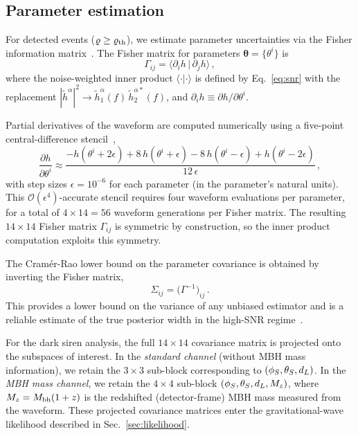 \subsection{Parameter estimation}
\label{sec:fisher}

For detected events ($\varrho \geq \varrho_\mathrm{th}$), we estimate parameter
uncertainties via the Fisher information matrix~\cite{Vallisneri:2007ev}.
The Fisher matrix for parameters $\boldsymbol{\theta} = \{\theta^i\}$ is
\begin{equation}
  \Gamma_{ij} = \bigl\langle \partial_i h \,\big|\, \partial_j h \bigr\rangle \,,
  \label{eq:fisher}
\end{equation}
where the noise-weighted inner product $\langle \cdot | \cdot \rangle$
is defined by Eq.~\eqref{eq:snr} with the replacement
$|\tilde{h}^\alpha|^2 \to
\tilde{h}_1^{\alpha}(f)\,\tilde{h}_2^{\alpha *}(f)$,
and $\partial_i h \equiv \partial h / \partial \theta^i$.

Partial derivatives of the waveform are computed numerically using a
five-point central-difference stencil~\cite{Vallisneri:2007ev},
\begin{equation}
  \frac{\partial h}{\partial \theta^i} \approx
  \frac{-h(\theta^i + 2\epsilon) + 8\,h(\theta^i + \epsilon)
    - 8\,h(\theta^i - \epsilon) + h(\theta^i - 2\epsilon)}
  {12\,\epsilon} \,,
  \label{eq:five_point}
\end{equation}
with step sizes $\epsilon = 10^{-6}$ for each parameter (in the
parameter's natural units).
This $\mathcal{O}(\epsilon^4)$-accurate stencil requires four waveform
evaluations per parameter, for a total of $4 \times 14 = 56$ waveform
generations per Fisher matrix.  The resulting $14 \times 14$ Fisher matrix
$\Gamma_{ij}$ is symmetric by construction, so the inner product
computation exploits this symmetry.

The Cram\'er-Rao lower bound on the parameter covariance is obtained
by inverting the Fisher matrix,
\begin{equation}
  \Sigma_{ij} = \bigl(\Gamma^{-1}\bigr)_{ij} \,.
  \label{eq:cramer_rao}
\end{equation}
This provides a lower bound on the variance of any unbiased estimator and
is a reliable estimate of the true posterior width in the high-SNR
regime~\cite{Vallisneri:2007ev}.

For the dark siren analysis, the full $14 \times 14$ covariance matrix is
projected onto the subspaces of interest.
In the \emph{standard channel} (without MBH mass information), we retain the
$3 \times 3$ sub-block corresponding to $(\phi_S, \theta_S, d_L)$.
In the \emph{MBH mass channel}, we retain the $4 \times 4$ sub-block
$(\phi_S, \theta_S, d_L, M_z)$, where $M_z = M_\mathrm{bh}(1+z)$ is the
redshifted (detector-frame) MBH mass measured from the waveform.
These projected covariance matrices enter the gravitational-wave likelihood
described in Sec.~\ref{sec:likelihood}.

